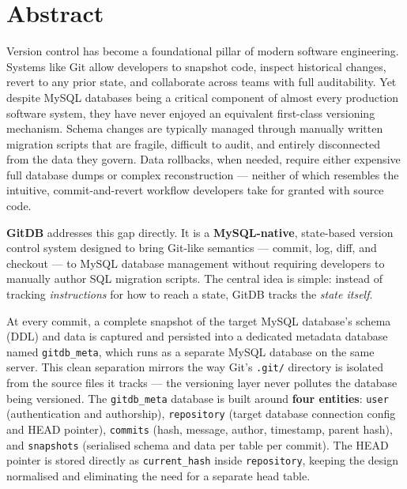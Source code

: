 \documentclass[12pt, a4paper]{article}
\begin{document}
\section*{Abstract}

\begin{onehalfspacing}

Version control has become a foundational pillar of modern software engineering.
Systems like Git allow developers to snapshot code, inspect historical changes,
revert to any prior state, and collaborate across teams with full auditability.
Yet despite MySQL databases being a critical component of almost every production
software system, they have never enjoyed an equivalent first-class versioning
mechanism. Schema changes are typically managed through manually written migration
scripts that are fragile, difficult to audit, and entirely disconnected from the
data they govern. Data rollbacks, when needed, require either expensive full
database dumps or complex reconstruction --- neither of which resembles the
intuitive, commit-and-revert workflow developers take for granted with source code.

\textbf{GitDB} addresses this gap directly. It is a \textbf{MySQL-native},
state-based version control system designed to bring Git-like semantics ---
commit, log, diff, and checkout --- to MySQL database management without requiring
developers to manually author SQL migration scripts. The central idea is simple:
instead of tracking \textit{instructions} for how to reach a state, GitDB tracks
the \textit{state itself}.

At every commit, a complete snapshot of the target MySQL database's schema (DDL)
and data is captured and persisted into a dedicated metadata database named
\texttt{gitdb\_meta}, which runs as a separate MySQL database on the same server.
This clean separation mirrors the way Git's \texttt{.git/} directory is isolated
from the source files it tracks --- the versioning layer never pollutes the
database being versioned. The \texttt{gitdb\_meta} database is built around
\textbf{four entities}: \texttt{user} (authentication and authorship),
\texttt{repository} (target database connection config and HEAD pointer),
\texttt{commits} (hash, message, author, timestamp, parent hash), and
\texttt{snapshots} (serialised schema and data per table per commit). The HEAD
pointer is stored directly as \texttt{current\_hash} inside \texttt{repository},
keeping the design normalised and eliminating the need for a separate head table.


\end{onehalfspacing}
\end{document}
